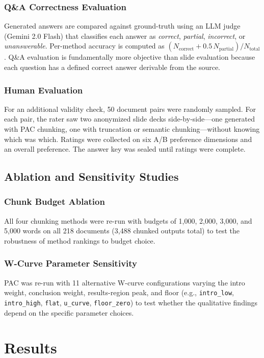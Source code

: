 \documentclass[journal]{IEEEtran}
\begin{document}
\subsubsection{Q\&A Correctness Evaluation}
Generated answers are compared against ground-truth using an LLM judge (Gemini 2.0 Flash) that classifies each answer as \textit{correct}, \textit{partial}, \textit{incorrect}, or \textit{unanswerable}. Per-method accuracy is computed as $(N_{\text{correct}} + 0.5\,N_{\text{partial}}) / N_{\text{total}}$. Q\&A evaluation is fundamentally more objective than slide evaluation because each question has a defined correct answer derivable from the source.

\subsubsection{Human Evaluation}
For an additional validity check, 50 document pairs were randomly sampled. For each pair, the rater saw two anonymized slide decks side-by-side---one generated with PAC chunking, one with truncation or semantic chunking---without knowing which was which. Ratings were collected on six A/B preference dimensions and an overall preference. The answer key was sealed until ratings were complete.

\subsection{Ablation and Sensitivity Studies}

\subsubsection{Chunk Budget Ablation}
All four chunking methods were re-run with budgets of 1{,}000, 2{,}000, 3{,}000, and 5{,}000 words on all 218 documents (3{,}488 chunked outputs total) to test the robustness of method rankings to budget choice.

\subsubsection{W-Curve Parameter Sensitivity}
PAC was re-run with 11 alternative W-curve configurations varying the intro weight, conclusion weight, results-region peak, and floor (e.g., \texttt{intro\_low}, \texttt{intro\_high}, \texttt{flat}, \texttt{u\_curve}, \texttt{floor\_zero}) to test whether the qualitative findings depend on the specific parameter choices.

\section{Results}
\label{sec:results}
\end{document}
